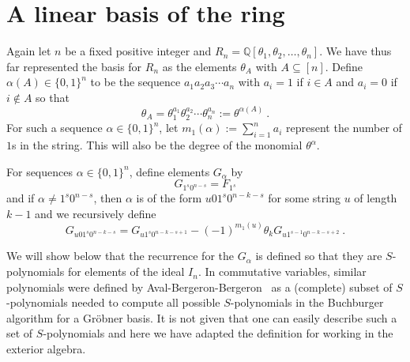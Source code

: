 \documentclass[11pt,oneside]{amsart}
\theoremstyle{definition}
\numberwithin{equation}{section}
\begin{document}
\section{A linear basis of the ring}\label{sec:linbasis}

Again let $n$ be a fixed positive integer and $R_n = {\mathbb Q}[\theta_1, \theta_2, \ldots, \theta_n]$.
We have thus far represented the basis for
$R_n$ as the elements $\theta_A$ with $A \subseteq [n]$.  Define $\alpha(A) \in \{ 0,1\}^n$ to be
the sequence $a_1 a_2 a_3 \cdots a_n$ with $a_i = 1$ if $i \in A$ and
$a_i = 0$ if $i \notin A$ so that
\[
\theta_A = \theta_1^{a_1} \theta_2^{a_2} \cdots \theta_n^{a_n} := \theta^{\alpha(A)}~.
\]
For such a sequence $\alpha \in \{0,1\}^n$, let $m_1(\alpha) := \sum_{i=1}^n a_i$
represent the number of $1$s in the string.  This will also be the degree of the monomial
$\theta^{\alpha}$.

For sequences $\alpha \in \{ 0, 1 \}^n$, define elements $G_\alpha$ by
\begin{equation}\label{eq:Gdef1}
G_{1^s0^{n-s}} = F_{1^s}
\end{equation}
and if $\alpha \neq 1^s 0^{n-s}$, then $\alpha$ is of the form $u01^s0^{n-k-s}$ for some string $u$
of length $k-1$ and we recursively define
\begin{equation}\label{eq:Gdef2}
G_{u01^s0^{n-k-s}} = G_{u1^s0^{n-k-s+1}} - (-1)^{m_1(u)} \theta_k G_{u1^{s-1}0^{n-k-s+2}}~.
\end{equation}

We will show below that the recurrence for the
$G_\alpha$ is defined so that they are $S$-polynomials \cite{CLO}
for elements of the ideal $I_n$.
In commutative variables, similar polynomials were defined by Aval-Bergeron-Bergeron~\cite{AB,ABB}
as a (complete) subset of $S$-polynomials needed to compute all possible
$S$-polynomials in the Buchburger algorithm for a Gr\"obner basis.
It is not given that one can easily describe such a set of $S$-polynomials and here we have adapted
the definition for working in the exterior algebra.
\end{document}
